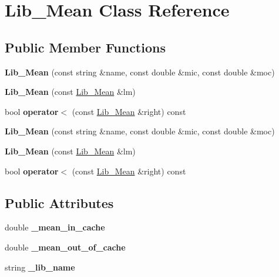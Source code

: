 \hypertarget{class_lib___mean}{}\section{Lib\+\_\+\+Mean Class Reference}
\label{class_lib___mean}
\subsection*{Public Member Functions}
\begin{DoxyCompactItemize}
\item 
\mbox{\label{class_lib___mean_a766d8884af4261117b8f9bba38bb54a7}} 
{\bfseries Lib\+\_\+\+Mean} (const string \&name, const double \&mic, const double \&moc)
\item 
\mbox{\label{class_lib___mean_a682a3425547f1ebac2aabb7d360fdb0d}} 
{\bfseries Lib\+\_\+\+Mean} (const \hyperlink{class_lib___mean}{Lib\+\_\+\+Mean} \&lm)
\item 
\mbox{\label{class_lib___mean_abb8a86c037fb3c353da5dc393a3210dd}} 
bool {\bfseries operator$<$} (const \hyperlink{class_lib___mean}{Lib\+\_\+\+Mean} \&right) const
\item 
\mbox{\label{class_lib___mean_a766d8884af4261117b8f9bba38bb54a7}} 
{\bfseries Lib\+\_\+\+Mean} (const string \&name, const double \&mic, const double \&moc)
\item 
\mbox{\label{class_lib___mean_a682a3425547f1ebac2aabb7d360fdb0d}} 
{\bfseries Lib\+\_\+\+Mean} (const \hyperlink{class_lib___mean}{Lib\+\_\+\+Mean} \&lm)
\item 
\mbox{\label{class_lib___mean_abb8a86c037fb3c353da5dc393a3210dd}} 
bool {\bfseries operator$<$} (const \hyperlink{class_lib___mean}{Lib\+\_\+\+Mean} \&right) const
\end{DoxyCompactItemize}
\subsection*{Public Attributes}
\begin{DoxyCompactItemize}
\item 
\mbox{\label{class_lib___mean_a6e33f7c9f311b8db9aab4a919506344d}} 
double {\bfseries \+\_\+mean\+\_\+in\+\_\+cache}
\item 
\mbox{\label{class_lib___mean_aeda167939c1fda8979d61467607bdaa3}} 
double {\bfseries \+\_\+mean\+\_\+out\+\_\+of\+\_\+cache}
\item 
\mbox{\label{class_lib___mean_a7573435cb9eefbadc37e0cc64a9ada0a}} 
string {\bfseries \+\_\+lib\+\_\+name}
\end{DoxyCompactItemize}


